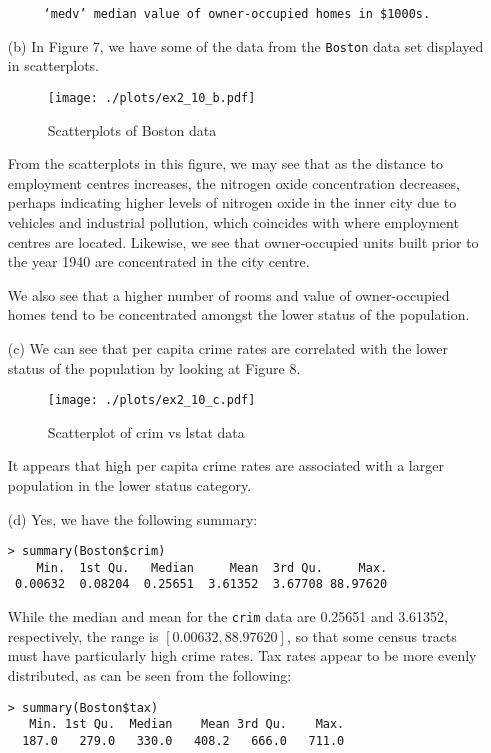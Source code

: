 \begin{itemize}
\begin{verbatim}
     ‘medv’ median value of owner-occupied homes in $1000s.
    \end{verbatim}
    \item[(b)] In Figure 7, we have some of the data from the \verb|Boston| data
    set displayed in scatterplots.\par
    \begin{figure}[!ht]
        \texttt{[image: ./plots/ex2\_10\_b.pdf]}
        \caption{Scatterplots of Boston data}
    \end{figure}
    \qquad From the scatterplots in this figure, we may see that as the distance to 
    employment centres increases, the nitrogen oxide concentration decreases,
    perhaps indicating higher levels of nitrogen oxide in the inner city due
    to vehicles and industrial pollution, which coincides with where employment
    centres are located. Likewise, we see that owner-occupied units built prior
    to the year 1940 are concentrated in the city centre.\par
    \qquad We also see that a higher number of rooms and value of owner-occupied 
    homes tend to be concentrated amongst the lower status of the population.
    \item[(c)] We can see that per capita crime rates are correlated with the
    lower status of the population by looking at Figure 8.
    \begin{figure}[!ht]
        \texttt{[image: ./plots/ex2\_10\_c.pdf]}
        \caption{Scatterplot of crim vs lstat data}
    \end{figure}
    It appears that high per capita crime rates are associated with a 
    larger population in the lower status category.
    \item[(d)] Yes, we have the following summary:
    \begin{verbatim}
> summary(Boston$crim)
    Min.  1st Qu.   Median     Mean  3rd Qu.     Max.
 0.00632  0.08204  0.25651  3.61352  3.67708 88.97620
    \end{verbatim}
    While the median and mean for the \verb|crim| data are 
    0.25651 and 3.61352, respectively, the range is $[0.00632, 88.97620]$,
    so that some census tracts must have particularly high crime rates.
    Tax rates appear to be more evenly distributed, as can be seen from the
    following:
    \begin{verbatim}
> summary(Boston$tax)
   Min. 1st Qu.  Median    Mean 3rd Qu.    Max.
  187.0   279.0   330.0   408.2   666.0   711.0
    \end{verbatim}

\end{itemize}
